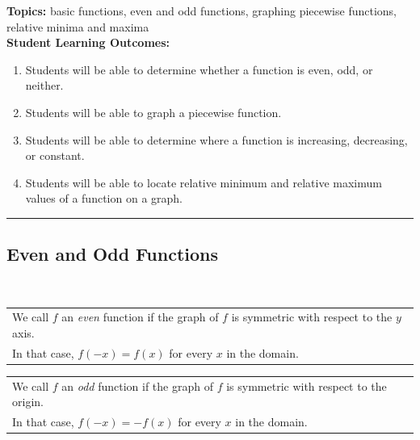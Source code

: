 

\noindent \textbf{Topics:}  basic functions, even and odd functions, graphing piecewise functions, relative minima and maxima\\

\noindent \textbf{Student Learning Outcomes:}
\begin{enumerate}
\item Students will be able to determine whether a function is even, odd, or neither.
\item Students will be able to graph a piecewise function.
\item Students will be able to determine where a function is increasing, decreasing, or constant.
\item  Students will be able to locate relative minimum and relative maximum values of a function on a graph.
\end{enumerate}

\hrule 

\bigskip

\subsection{Even and Odd Functions} ~


\noindent \begin{tabular}{| l |} \hline
We call $f$ an \emph{even} function if the graph of $f$ is symmetric with respect to the $y$ axis.\\ In that case, $f(-x)=f(x)$ for every $x$ in the domain. \\ \hline
\end{tabular}



\noindent \begin{tabular}{| l |} \hline
We call $f$ an \emph{odd} function if the graph of $f$ is symmetric with respect to the origin.\\ In that case, $f(-x)=-f(x)$ for every $x$ in the domain. \\ \hline
\end{tabular}



